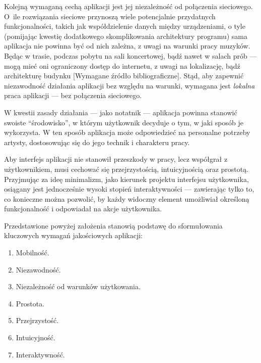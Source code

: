 Kolejną wymaganą cechą aplikacji jest jej niezależność od połączenia sieciowego.
O~ile rozwiązania sieciowe przynoszą wiele potencjalnie przydatnych funkcjonalności,
takich jak współdzielenie danych między urządzeniami,
o tyle (pomijając kwestię dodatkowego skomplikowania architektury programu)
sama aplikacja nie powinna być od nich zależna, z uwagi na warunki pracy muzyków.
Będąc w trasie, podczas pobytu na sali koncertowej, bądź nawet w salach prób — mogą mieć oni ograniczony dostęp do internetu,
z uwagi na lokalizację, bądź architekturę budynku [Wymagane źródło bibliograficzne].
Stąd, aby zapewnić niezawodność działania aplikacji bez względu na warunki, wymagana jest \textit{lokalna} praca aplikacji —
bez połączenia sieciowego.

W kwestii zasady działania — jako notatnik — aplikacja powinna stanowić swoiste \enquote{środowisko},
w którym użytkownik decyduje o tym, w jaki sposób je wykorzysta.
W ten sposób aplikacja może odpowiedzieć na personalne potrzeby artysty, dostosowując się do jego technik i charakteru pracy.

Aby interfejs aplikacji nie stanowił przeszkody w pracy, lecz współgrał z użytkownikiem, musi cechować się przejrzystością,
intuicyjnością oraz prostotą.
Przyjmując za ideę minimalizm, jako kierunek projektu interfejsu użytkownika, osiągany jest jednocześnie wysoki stopień
interaktywności — zawierając tylko to, co konieczne można pozwolić, by każdy widoczny element umożliwiał określoną
funkcjonalność i odpowiadał na akcje użytkownika.

Przedstawione powyżej założenia stanowią podstawę do sformułowania kluczowych wymagań jakościowych aplikacji:
\begin{enumerate}
	\item Mobilność.
	\item Niezawodność.
	\item Niezależność od warunków użytkowania.
	\item Prostota.
	\item Przejrzystość.
	\item Intuicyjność.
	\item Interaktywność.
\end{enumerate}

